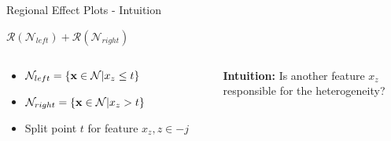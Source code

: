 \documentclass[11pt,compress,t,notes=noshow, aspectratio=169, xcolor=table,dvipsnames]{beamer}
\begin{document}
\begin{frame}{Regional Effect Plots - Intuition}
\begin{itemize}
\medskip

\centerline{$\mathcal{R}\left(\mathcal{N}_{left}\right) + \mathcal{R}\left(\mathcal{N}_{right}\right)$}
\end{itemize}

      \begin{columns}[c, totalwidth=\textwidth]
        \begin{column}{0.4\textwidth}
    \begin{itemize}
        \item $\mathcal{N}_{left} = \{\mathbf{x} \in \mathcal{N}|x_z \leq t\}$
        \item $\mathcal{N}_{right} = \{\mathbf{x} \in \mathcal{N}|x_z > t\}$
        \item Split point $t$ for feature $x_z, z \in -j$
    \end{itemize}
        \end{column}
          \begin{column}{0.59\textwidth}
          \centering
          \textbf{Intuition:} Is another feature $x_z$ \\responsible for the heterogeneity?
        \end{column}
    \end{columns}
\end{frame}
\end{document}
